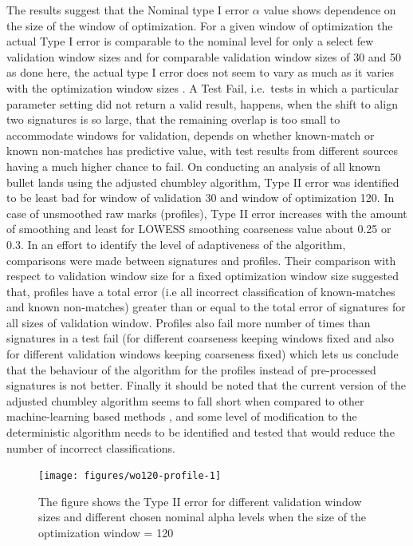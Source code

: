 \documentclass[12pt]{article}
\begin{document}
The results suggest that the Nominal type I error \(\alpha\) value shows
dependence on the size of the window of optimization. For a given window
of optimization the actual Type I error is comparable to the nominal
level for only a select few validation window sizes and for comparable
validation window sizes of 30 and 50 as done here, the actual type I
error does not seem to vary as much as it varies with the optimization
window sizes . A Test Fail, i.e.~tests in which a particular parameter
setting did not return a valid result, happens, when the shift to align
two signatures is so large, that the remaining overlap is too small to
accommodate windows for validation, depends on whether known-match or
known non-matches has predictive value, with test results from different
sources having a much higher chance to fail. On conducting an analysis
of all known bullet lands using the adjusted chumbley algorithm, Type II
error was identified to be least bad for window of validation 30 and
window of optimization 120. In case of unsmoothed raw marks (profiles),
Type II error increases with the amount of smoothing and least for
LOWESS smoothing coarseness value about 0.25 or 0.3. In an effort to
identify the level of adaptiveness of the algorithm, comparisons were
made between signatures and profiles. Their comparison with respect to
validation window size for a fixed optimization window size suggested
that, profiles have a total error (i.e all incorrect classification of
known-matches and known non-matches) greater than or equal to the total
error of signatures for all sizes of validation window. Profiles also
fail more number of times than signatures in a test fail (for different
coarseness keeping windows fixed and also for different validation
windows keeping coarseness fixed) which lets us conclude that the
behaviour of the algorithm for the profiles instead of pre-processed
signatures is not better. Finally it should be noted that the current
version of the adjusted chumbley algorithm seems to fall short when
compared to other machine-learning based methods \citet{aoas}, and some
level of modification to the deterministic algorithm needs to be
identified and tested that would reduce the number of incorrect
classifications.

\begin{figure}

{\centering \texttt{[image: figures/wo120-profile-1]} 

}

\caption{The figure shows the Type II error for different validation window sizes and different chosen nominal alpha levels when the size of the optimization window = 120}\label{fig:wo120-profile}
\end{figure}



\end{document}
